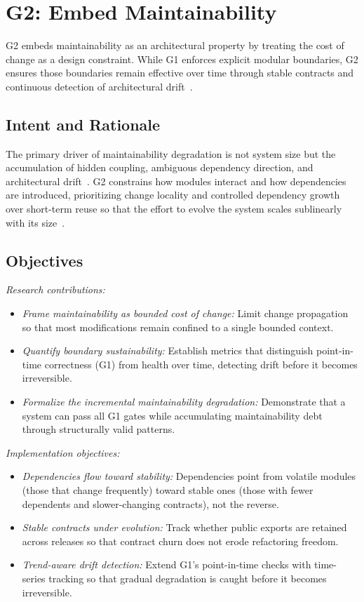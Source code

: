 \pagebreak
\section{G2: Embed Maintainability}
\label{sec:g2-embed-maintainability}

G2 embeds maintainability as an architectural property by treating the cost of change as a design constraint. While G1 enforces explicit modular boundaries, G2 ensures those boundaries remain effective over time through stable contracts and continuous detection of architectural drift~\cite{gravanis2021dont,blinowski2022monolithic}.

\subsection*{Intent and Rationale}
The primary driver of maintainability degradation is not system size but the accumulation of hidden coupling, ambiguous dependency direction, and architectural drift~\cite{gravanis2021dont,blinowski2022monolithic,khononov2024balancing}. G2 constrains how modules interact and how dependencies are introduced, prioritizing change locality and controlled dependency growth over short-term reuse so that the effort to evolve the system scales sublinearly with its size~\cite{arya2024beyond,berry2024isItWorth}.

\subsection*{Objectives}

\emph{Research contributions:}
\begin{itemize}[itemsep=8pt,topsep=2pt]
  \item \emph{Frame maintainability as bounded cost of change:} Limit change propagation so that most modifications remain confined to a single bounded context.
  \item \emph{Quantify boundary sustainability:} Establish metrics that distinguish point-in-time correctness (G1) from health over time, detecting drift before it becomes irreversible.
  \item \emph{Formalize the incremental maintainability degradation:} Demonstrate that a system can pass all G1 gates while accumulating maintainability debt through structurally valid patterns.
\end{itemize}

\emph{Implementation objectives:}
\begin{itemize}[itemsep=8pt,topsep=2pt]
  \item \emph{Dependencies flow toward stability:} Dependencies point from volatile modules (those that change frequently) toward stable ones (those with fewer dependents and slower-changing contracts), not the reverse.
  \item \emph{Stable contracts under evolution:} Track whether public exports are retained across releases so that contract churn does not erode refactoring freedom.
  \item \emph{Trend-aware drift detection:} Extend G1's point-in-time checks with time-series tracking so that gradual degradation is caught before it becomes irreversible.
\end{itemize}

